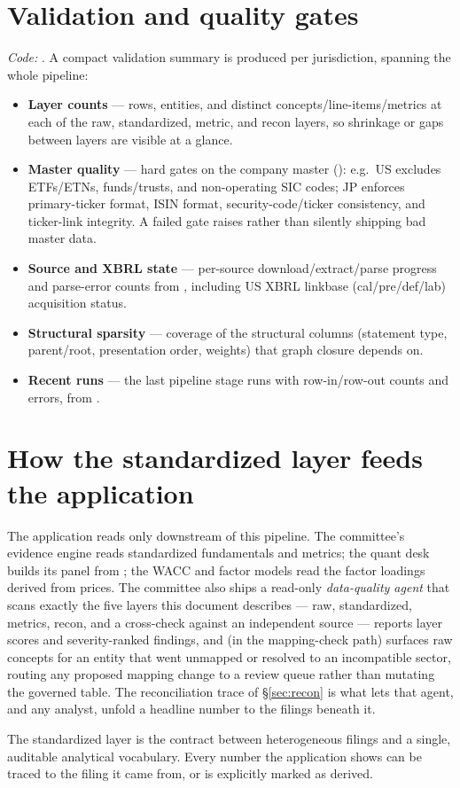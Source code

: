 \documentclass[11pt]{article}
\begin{document}
\section{Validation and quality gates}
\label{sec:validate}
\emph{Code:} . A compact validation summary is produced
per jurisdiction, spanning the whole pipeline:

\begin{itemize}
  \item \textbf{Layer counts} --- rows, entities, and distinct
        concepts/line-items/metrics at each of the raw, standardized, metric, and
        recon layers, so shrinkage or gaps between layers are visible at a glance.
  \item \textbf{Master quality} --- hard gates on the company master
        (): e.g.\ US excludes ETFs/ETNs, funds/trusts,
        and non-operating SIC codes; JP enforces primary-ticker format, ISIN
        format, security-code/ticker consistency, and ticker-link integrity.
        A failed gate raises rather than silently shipping bad master data.
  \item \textbf{Source and XBRL state} --- per-source download/extract/parse
        progress and parse-error counts from , including
        US XBRL linkbase (cal/pre/def/lab) acquisition status.
  \item \textbf{Structural sparsity} --- coverage of the structural columns
        (statement type, parent/root, presentation order, weights) that graph
        closure depends on.
  \item \textbf{Recent runs} --- the last pipeline stage runs with row-in/row-out
        counts and errors, from .
\end{itemize}

\section{How the standardized layer feeds the application}
The application reads only downstream of this pipeline. The committee's evidence
engine reads standardized fundamentals and metrics; the quant desk builds its panel
from ; the WACC and factor models read the factor loadings
derived from prices. The committee also ships a read-only \emph{data-quality agent}
that scans exactly the five layers this document describes --- raw, standardized,
metrics, recon, and a cross-check against an independent source --- reports layer
scores and severity-ranked findings, and (in the mapping-check path) surfaces
raw concepts for an entity that went unmapped or resolved to an incompatible
sector, routing any proposed mapping change to a review queue rather than mutating
the governed table. The reconciliation trace of \S\ref{sec:recon} is what lets that
agent, and any analyst, unfold a headline number to the filings beneath it.

\vfill
\begin{center}\small\color{muted}
The standardized layer is the contract between heterogeneous filings and a single,
auditable analytical vocabulary. Every number the application shows can be traced
to the filing it came from, or is explicitly marked as derived.
\end{center}
\end{document}

